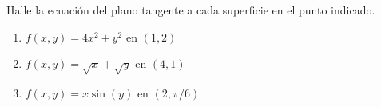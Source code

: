 Halle la ecuación del plano tangente a cada superficie en el punto indicado.
\begin{enumerate}
    \item $f(x,y) = 4x^2 + y^2$ en $(1, 2)$
    \item $f(x,y) = \sqrt{x} + \sqrt{y}$ en $(4, 1)$
    \item $f(x,y) = x\sin(y)$ en $(2, \pi/6)$
\end{enumerate}
